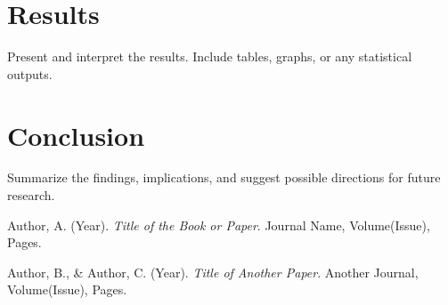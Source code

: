 \documentclass[12pt,letterpaper]{article}
\begin{document}
\section{Results}
Present and interpret the results. Include tables, graphs, or any statistical outputs.

\section{Conclusion}
Summarize the findings, implications, and suggest possible directions for future research.

\newpage

\begin{thebibliography}{99}

Author, A. (Year). \textit{Title of the Book or Paper}. Journal Name, Volume(Issue), Pages.

Author, B., & Author, C. (Year). \textit{Title of Another Paper}. Another Journal, Volume(Issue), Pages.

\end{thebibliography}
\end{document}
